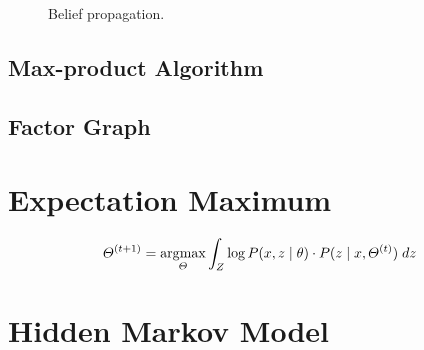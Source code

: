 \begin{figure}
	\centering
	
	\caption{Belief propagation.}
	\label{fig:belief_propagation}
\end{figure}


\subsection{Max-product Algorithm} %
\label{sub:Max-product Algorithm}


\subsection{Factor Graph} %
\label{sub:Factor Graph}



\section{Expectation Maximum} %
\label{sec:Expectation Maximum}

\[
	\Theta^{\left(t+1\right)} = \argmax_{\Theta} \int_Z \log P \giventhat{x,z}{\theta} \cdot P \giventhat{z}{x, \Theta^{\left(t\right)}} \; dz
\]


\section{Hidden Markov Model} %
\label{sec:Hidden Markov Model}


